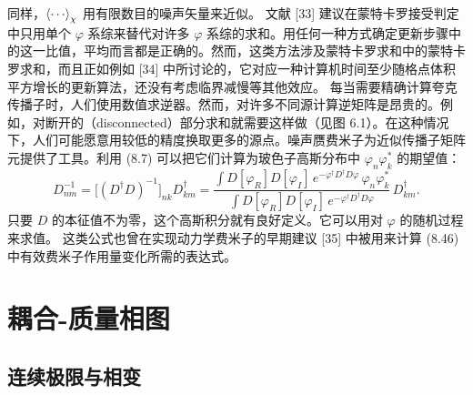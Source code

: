 同样，$\ev{\cdots}_\chi$ 用有限数目的噪声矢量来近似。
文献 [33] 建议在蒙特卡罗接受判定中只用单个 $\varphi$ 系综来替代对许多 $\varphi$ 系综的求和。用任何一种方式确定更新步骤中的这一比值，平均而言都是正确的。然而，这类方法涉及蒙特卡罗求和中的蒙特卡罗求和，而且正如例如 [34] 中所讨论的，它对应一种计算机时间至少随格点体积平方增长的更新算法，还没有考虑临界减慢等其他效应。
每当需要精确计算夸克传播子时，人们使用数值求逆器。然而，对许多不同源计算逆矩阵是昂贵的。例如，对断开的（disconnected）部分求和就需要这样做（见图 6.1）。在这种情况下，人们可能愿意用较低的精度换取更多的源点。噪声赝费米子为近似传播子矩阵元提供了工具。利用 (8.7) 可以把它们计算为玻色子高斯分布中 $\varphi_n\varphi_k^*$ 的期望值：
\begin{equation}
D_{nm}^{-1} = \Big[(D^\dagger D)^{-1}\Big]_{nk}D_{km}^\dagger
= \frac{\int D[\varphi_R]D[\varphi_I]\,e^{-\varphi^\dagger D^\dagger D\varphi}\,\varphi_n\varphi_k^*}
       {\int D[\varphi_R]D[\varphi_I]\,e^{-\varphi^\dagger D^\dagger D\varphi}}\,D_{km}^\dagger .
\end{equation}
只要 $D$ 的本征值不为零，这个高斯积分就有良好定义。它可以用对 $\varphi$ 的随机过程来求值。
这类公式也曾在实现动力学费米子的早期建议 [35] 中被用来计算 (8.46) 中有效费米子作用量变化所需的表达式。

\section{耦合-质量相图}

\subsection{连续极限与相变}

